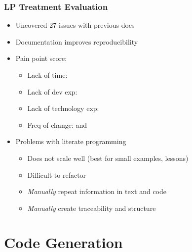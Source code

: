 \documentclass[usenames,dvipsnames]{beamer}
\newcommand{\cross}{{\LARGE {\color{red}\ding{55}}}}
\newcommand{\greencheck}{{\LARGE {\color{ForestGreen}\checkmark}}}
\newcommand{\bluedash}{{\LARGE {\color{blue}{--}}}}
\begin{document}
\begin{frame}
  
  \frametitle{LP Treatment Evaluation}
  
  \begin{itemize}
  \item Uncovered 27 issues with previous docs
  \item Documentation improves reproducibility
  \item Pain point score:
  \begin{itemize}
    \item Lack of time: \greencheck %
    \item Lack of dev exp: \bluedash %
    \item Lack of technology exp: \cross %
    \item Freq of change: \greencheck and \cross %
  \end{itemize}
  \item Problems with literate programming
  \begin{itemize}
    \item Does not scale well (best for small examples, lessons) %
    \item Difficult to refactor
    \item \emph{Manually} repeat information in text and code
    \item \emph{Manually} create traceability and structure
  \end{itemize}
  \end{itemize}

\end{frame}
  

\section[Code Gen]{Code Generation}

\end{document}
